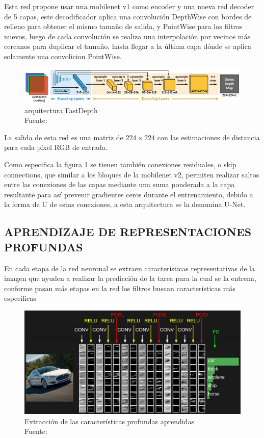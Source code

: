         	Esta red propone usar una mobilenet v1 como encoder y una nueva red decoder de 5 capas, este decodificador aplica una convolución DepthWise con bordes de relleno para obtener el mismo tamaño de salida, y PointWise para los filtros nuevos, luego de cada convolución se realiza una interpolación por vecinos más cercanos para duplicar el tamaño, hasta llegar a la última capa dónde se aplica solamente una convolicion PointWise.
        	
        	\begin{figure}[H]
        		\centering
        		\includegraphics[scale=0.11]{imagenes/fastdepth}
        		\caption[Arquitectura FastDepth]{arquitectura FastDepth\\ Fuente: \citep{icra_2019_fastdepth}}\label{fastdepth}
        	\end{figure}
        	
        	La salida de esta red es una matriz de $224\times224$ con las estimaciones de distancia para cada píxel RGB de entrada.
        	
        	Como especifica la figura \ref{fastdepth} se tienen también conexiones residuales, o skip connections, que similar a los bloques de la mobilenet v2, permiten realizar saltos entre las conexiones de las capas mediante una suma ponderada a la capa resultante para así prevenir gradientes ceros durante el entrenamiento, debido a la forma de U de estas conexiones, a esta arquitectura se la denomina U-Net.
    \subsection{APRENDIZAJE DE REPRESENTACIONES PROFUNDAS}
	    En cada etapa de la red neuronal se extraen características representativas de la imagen que ayuden a realizar la predicción de la tarea para la cual se la entrena, conforme pasan más etapas en la red los filtros buscan características más específicas \citep{Goodfellow-et-al-2016}
	    
	    \begin{figure}[H]
 	        \centering
 	        \includegraphics[scale=0.23]{imagenes/convnet}
 		    \caption[Extracción de las características profundas aprendidas]{Extracción de las características profundas aprendidas\\ Fuente: \citep{stanford_2020}}
	    \end{figure}

